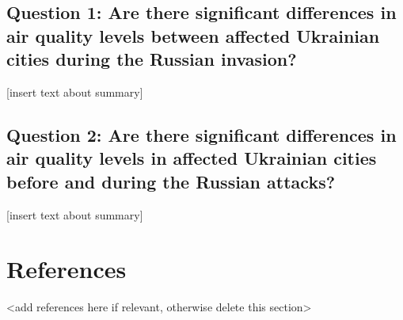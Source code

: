 \documentclass[
  12pt,
]{article}
\begin{document}
\hypertarget{question-1-are-there-significant-differences-in-air-quality-levels-between-affected-ukrainian-cities-during-the-russian-invasion-1}{%
\subsection{Question 1: Are there significant differences in air quality
levels between affected Ukrainian cities during the Russian
invasion?}\label{question-1-are-there-significant-differences-in-air-quality-levels-between-affected-ukrainian-cities-during-the-russian-invasion-1}}

{[}insert text about summary{]}

\hypertarget{question-2-are-there-significant-differences-in-air-quality-levels-in-affected-ukrainian-cities-before-and-during-the-russian-attacks-1}{%
\subsection{Question 2: Are there significant differences in air quality
levels in affected Ukrainian cities before and during the Russian
attacks?}\label{question-2-are-there-significant-differences-in-air-quality-levels-in-affected-ukrainian-cities-before-and-during-the-russian-attacks-1}}

{[}insert text about summary{]}

\newpage

\hypertarget{references}{%
\section{References}\label{references}}

\textless add references here if relevant, otherwise delete this
section\textgreater{}
\end{document}
